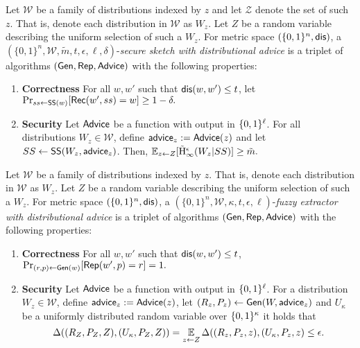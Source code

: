 \begin{definition}
\label{def:ss distributional}
Let $\mathcal{W}$ be a family of distributions indexed by $z$ and let $\mathcal{Z}$ denote the set of such $z$.  That is, denote each distribution in $\mathcal{W}$ as $W_z$.  Let $Z$ be a random variable describing the uniform selection of such a $W_z$.
For metric space $(\{0,1\}^n, \mathsf{dis})$, a $(\{0,1\}^n, \mathcal{W}, \tilde{m}, t, \epsilon, \ell, \delta)$-\emph{secure sketch with distributional advice} is a triplet of algorithms $({\mathsf{Gen}}, {\mathsf{Rep}}, {\mathsf{Advice}})$ with the following properties:
\begin{enumerate} 
\itemsep0em
\item \textbf{Correctness} For all $w, w'$ such that $\mathsf{dis}(w, w')\le t$, let $\Pr_{ss \leftarrow {\ensuremath{\mathsf{SS}}}(w)}[{\mathsf{Rec}}(w', ss) = w]\ge 1-\delta.$
\item \textbf{Security} Let ${\mathsf{Advice}}$ be a function with output in $\{0, 1\}^\ell$.  For all distributions $W_z \in \mathcal{W}$, define ${\mathsf{advice}}_z:= {\mathsf{Advice}}(z)$ and let $SS \leftarrow {\ensuremath{\mathsf{SS}}}(W_z, {\mathsf{advice}}_z)$. Then,
$
\operatorname*{\mathbb{E}}_{z\leftarrow Z} [\tilde{\mathrm{H}}_\infty^\epsilon(W_z| SS)] \ge \tilde{m}.
$
\end{enumerate}
\end{definition}


\begin{definition}
\label{def:fe distributional}
Let $\mathcal{W}$ be a family of distributions indexed by $z$.  That is, denote each distribution in $\mathcal{W}$ as $W_z$.  Let $Z$ be a random variable describing the uniform selection of such a $W_z$.
For metric space $(\{0,1\}^n, \mathsf{dis})$, a $(\{0,1\}^n, \mathcal{W}, \kappa, t, \epsilon, \ell)$-\emph{fuzzy extractor with distributional advice} is a triplet of algorithms $({\mathsf{Gen}}, {\mathsf{Rep}}, {\mathsf{Advice}})$ with the following properties:
\begin{enumerate} 
\itemsep0em
\item \textbf{Correctness} For all $w, w'$ such that $\mathsf{dis}(w, w')\le t$, $\Pr_{(r, p) \leftarrow {\ensuremath{\mathsf{Gen}}}(w)}[{\mathsf{Rep}}(w', p) = r]=1.$
\item \textbf{Security} Let ${\mathsf{Advice}}$ be a function with output in $\{0, 1\}^\ell$.  For a distribution $W_z \in \mathcal{W}$, define ${\mathsf{advice}}_z:= {\mathsf{Advice}}(z)$, let $(R_z, P_z) \leftarrow {\ensuremath{\mathsf{Gen}}}(W, {\mathsf{advice}}_z)$ and $U_\kappa$ be a uniformly distributed random variable over $\{0, 1\}^\kappa$ it holds that \[
\Delta((R_Z, P_Z, Z), (U_\kappa, P_Z, Z)) = \operatorname*{\mathbb{E}}_{z\leftarrow Z} \Delta((R_z, P_z, z), (U_\kappa, P_z, z)\le \epsilon.\]
\end{enumerate}
\end{definition}

